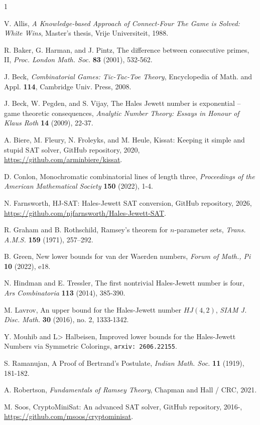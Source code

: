 \documentclass[11pt]{article}
\theoremstyle{definition}
\begin{document}
\begin{thebibliography}{1} \footnotesize



 V. Allis, {\it A Knowledge-based Approach of Connect-Four The Game is Solved: White Wins}, Master's thesis,
Vrije Universiteit, 1988.







 R. Baker, G. Harman, and J. Pintz,   The difference between consecutive primes, II,
{\it Proc. London Math. Soc.} {\bf 83} (2001), 532-562.

 J. Beck, {\it Combinatorial Games: Tic-Tac-Toe Theory}, Encyclopedia of Math. and Appl. {\bf 114}, Cambridge
Univ. Press, 2008.

 J. Beck, W. Pegden, and S. Vijay, The Hales Jewett number is exponential -- game theoretic consequences,
{\it Analytic Number Theory: Essays in Honour of Klaus Roth} {\bf 14} (2009), 22-37.

 A. Biere, M. Fleury, N. Froleyks, and M. Heule, {Kissat: Keeping it simple and stupid SAT solver}, GitHub repository, 2020, \url{https://github.com/arminbiere/kissat}.

D. Conlon, Monochromatic combinatorial lines of length three, {\it Proceedings of the American Mathematical Society} {\bf 150} (2022), 1-4.

 N. Farnsworth, {HJ-SAT: Hales-Jewett SAT conversion}, GitHub repository, 2026, 
\url{https://github.com/njfarnsworth/Hales-Jewett-SAT}.

 R. Graham and B. Rothschild, Ramsey's theorem for $n$-parameter sets, 
{\it Trans. A.M.S.} {\bf 159} (1971), 257–292.

 B. Green, New lower bounds for van der Waerden numbers, {\it Forum of Math., Pi} {\bf 10} (2022), e18.

 N. Hindman and E. Tressler, The first nontrivial Hales-Jewett number is four, {\it Ars Combinatoria} {\bf 113} (2014), 385-390.

M. Lavrov, An upper bound for the Hales-Jewett number $HJ(4,2)$, {\it SIAM J. Disc. Math.} {\bf 30} (2016), no. 2, 1333-1342.

 Y. Mouhib and L> Halbeisen, Improved lower bounds for the Hales-Jewett Numbers via Symmetric Colorings, {\tt arxiv: 2606.22155}.

 S.   Ramanujan, A Proof of Bertrand's Postulate, {\it Indian Math. Soc.} {\bf 11} (1919), 181-182.

 A. Robertson, {\it Fundamentals of Ramsey Theory},
Chapman and Hall / CRC,  2021.

 M. Soos, {CryptoMiniSat: An advanced SAT solver}, GitHub repository, 2016-, \url{https://github.com/msoos/cryptominisat}.


\end{thebibliography}
\end{document}

